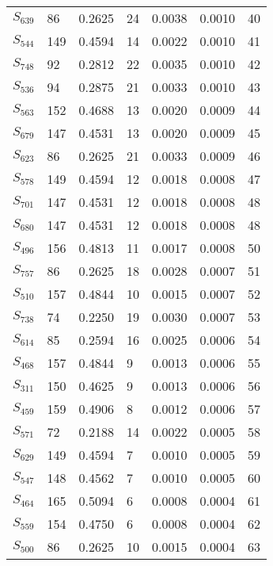\begin{xltabular}{\textwidth}{XPPPPPP}
  $S_{639}$ & 86 & 0.2625 & 24 & 0.0038 & 0.0010 & 40 \\ 
  $S_{544}$ & 149 & 0.4594 & 14 & 0.0022 & 0.0010 & 41 \\ 
  $S_{748}$ & 92 & 0.2812 & 22 & 0.0035 & 0.0010 & 42 \\ 
  $S_{536}$ & 94 & 0.2875 & 21 & 0.0033 & 0.0010 & 43 \\ 
  $S_{563}$ & 152 & 0.4688 & 13 & 0.0020 & 0.0009 & 44 \\ 
  $S_{679}$ & 147 & 0.4531 & 13 & 0.0020 & 0.0009 & 45 \\ 
  $S_{623}$ & 86 & 0.2625 & 21 & 0.0033 & 0.0009 & 46 \\ 
  $S_{578}$ & 149 & 0.4594 & 12 & 0.0018 & 0.0008 & 47 \\ 
  $S_{701}$ & 147 & 0.4531 & 12 & 0.0018 & 0.0008 & 48 \\ 
  $S_{680}$ & 147 & 0.4531 & 12 & 0.0018 & 0.0008 & 48 \\ 
  $S_{496}$ & 156 & 0.4813 & 11 & 0.0017 & 0.0008 & 50 \\ 
  $S_{757}$ & 86 & 0.2625 & 18 & 0.0028 & 0.0007 & 51 \\ 
  $S_{510}$ & 157 & 0.4844 & 10 & 0.0015 & 0.0007 & 52 \\ 
  $S_{738}$ & 74 & 0.2250 & 19 & 0.0030 & 0.0007 & 53 \\ 
  $S_{614}$ & 85 & 0.2594 & 16 & 0.0025 & 0.0006 & 54 \\ 
  $S_{468}$ & 157 & 0.4844 & 9 & 0.0013 & 0.0006 & 55 \\ 
  $S_{311}$ & 150 & 0.4625 & 9 & 0.0013 & 0.0006 & 56 \\ 
  $S_{459}$ & 159 & 0.4906 & 8 & 0.0012 & 0.0006 & 57 \\ 
  $S_{571}$ & 72 & 0.2188 & 14 & 0.0022 & 0.0005 & 58 \\ 
  $S_{629}$ & 149 & 0.4594 & 7 & 0.0010 & 0.0005 & 59 \\ 
  $S_{547}$ & 148 & 0.4562 & 7 & 0.0010 & 0.0005 & 60 \\ 
  $S_{464}$ & 165 & 0.5094 & 6 & 0.0008 & 0.0004 & 61 \\ 
  $S_{559}$ & 154 & 0.4750 & 6 & 0.0008 & 0.0004 & 62 \\ 
  $S_{500}$ & 86 & 0.2625 & 10 & 0.0015 & 0.0004 & 63 \\ 

\end{xltabular}
